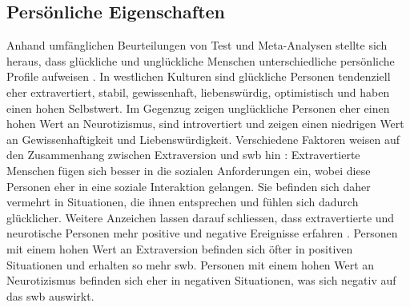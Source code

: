 \subsection{Persönliche Eigenschaften}\label{subsec.swbPersTraits}
Anhand umfänglichen Beurteilungen von Test und Meta-Analysen stellte sich heraus, dass glückliche und unglückliche Menschen unterschiedliche persönliche Profile aufweisen \cite{Diener:2008, Steel:2008}. In westlichen Kulturen sind glückliche Personen tendenziell eher extravertiert, stabil, gewissenhaft, liebenswürdig, optimistisch und haben einen hohen Selbstwert. Im Gegenzug zeigen unglückliche Personen eher einen hohen Wert an Neurotizismus, sind introvertiert und zeigen einen niedrigen Wert an Gewissenhaftigkeit und Liebenswürdigkeit. \newline
Verschiedene Faktoren weisen auf den Zusammenhang zwischen Extraversion und \gls{swb} hin \cite{Diener:1999}: Extravertierte Menschen fügen sich besser in die sozialen Anforderungen ein, wobei diese Personen eher in eine soziale Interaktion gelangen. Sie befinden sich daher vermehrt in Situationen, die ihnen entsprechen und fühlen sich dadurch glücklicher. Weitere Anzeichen lassen darauf schliessen, dass extravertierte und neurotische Personen mehr positive und negative Ereignisse erfahren \cite{Carr:2011}. Personen mit einem hohen Wert an Extraversion befinden sich öfter in positiven Situationen und erhalten so mehr \gls{swb}. Personen mit einem hohen Wert an Neurotizismus befinden sich eher in negativen Situationen, was sich negativ auf das \gls{swb} auswirkt.	


